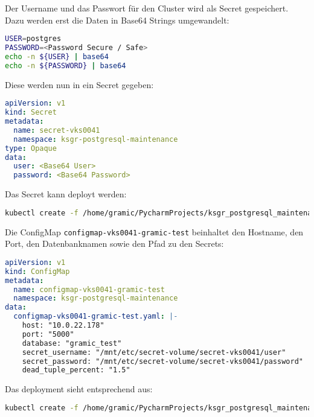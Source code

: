 \begin{flushleft}
    Der Username und das Passwort für den Cluster wird als Secret gespeichert.\\
    Dazu werden erst die Daten in Base64 Strings umgewandelt:
    \lstset{style=gra_codestyle}
    \begin{lstlisting}[language=bash, caption=Maintenance-Tool - Bloated Tables / Indices - Base64,captionpos=b,label={lst:maintenannce-tool-bloated-tables-base64},breaklines=true]
USER=postgres
PASSWORD=<Password Secure / Safe>
echo -n ${USER} | base64
echo -n ${PASSWORD} | base64
    \end{lstlisting}
    Diese werden nun in ein Secret gegeben:
    \lstset{style=gra_codestyle}
    \begin{lstlisting}[language=yaml, caption=Maintenance-Tool - Bloated Tables / Indices - Secret,captionpos=b,label={lst:maintenannce-tool-bloated-tables-secret},breaklines=true]
apiVersion: v1
kind: Secret
metadata:
  name: secret-vks0041
  namespace: ksgr-postgresql-maintenance
type: Opaque
data:
  user: <Base64 User>
  password: <Base64 Password>
    \end{lstlisting}
    Das Secret kann deployt werden:
    \lstset{style=gra_codestyle}
    \begin{lstlisting}[language=bash, caption=Maintenance-Tool - Bloated Tables / Indices - Secret Deploy,captionpos=b,label={lst:maintenannce-tool-bloated-tables-secret-deploy},breaklines=true]
kubectl create -f /home/gramic/PycharmProjects/ksgr_postgresql_maintenance/secret_vks0041.yaml
    \end{lstlisting}
\end{flushleft}
\begin{flushleft}
    Die ConfigMap \texttt{configmap-vks0041-gramic-test} beinhaltet den Hostname, den Port, den Datenbanknamen sowie den Pfad zu den Secrets:
    \lstset{style=gra_codestyle}
    \begin{lstlisting}[language=yaml, caption=Maintenance-Tool - Bloated Tables / Indices - configmap-vks0041-gramic-test,captionpos=b,label={lst:maintenannce-tool-bloated-tables-configmap-vks0041-gramic-test},breaklines=true]
apiVersion: v1
kind: ConfigMap
metadata:
  name: configmap-vks0041-gramic-test
  namespace: ksgr-postgresql-maintenance
data:
  configmap-vks0041-gramic-test.yaml: |-
    host: "10.0.22.178"
    port: "5000"
    database: "gramic_test"
    secret_username: "/mnt/etc/secret-volume/secret-vks0041/user"
    secret_password: "/mnt/etc/secret-volume/secret-vks0041/password"
    dead_tuple_percent: "1.5"
    \end{lstlisting}
    Das deployment sieht entsprechend aus:
    \lstset{style=gra_codestyle}
    \begin{lstlisting}[language=bash, caption=Maintenance-Tool - Bloated Tables / Indices - configmap-vks0041-gramic-test Deploy,captionpos=b,label={lst:maintenannce-tool-bloated-tables-configmap-vks0041-gramic-test-deploy},breaklines=true]
kubectl create -f /home/gramic/PycharmProjects/ksgr_postgresql_maintenance/cleaned/configmap-vks0041-gramic_test.yaml
    \end{lstlisting}
\end{flushleft}
